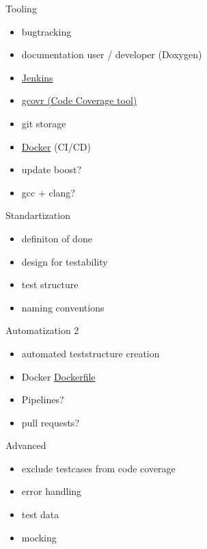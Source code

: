 \documentclass{beamer}
\begin{document}
    \begin{frame}{Tooling}
        \begin{itemize}
            \item bugtracking
            \item documentation user / developer (Doxygen)
            \item \href{https://www.jenkins.io/doc/}{Jenkins}
            \item \href{https://www.gcovr.com/en/stable/guide.html}{gcovr (Code Coverage tool)}
            \item git storage
            \item \href{https://docs.docker.com/}{Docker} (CI/CD)
            \item update boost?
            \item gcc + clang?
        \end{itemize}
    \end{frame}

    \begin{frame}{Standartization}
        \begin{itemize}
            \item definiton of done
            \item design for testability
            \item test structure
            \item naming conventions
        \end{itemize}
    \end{frame}

    \begin{frame}{Automatization 2}
        \begin{itemize}
            \item automated teststructure creation 
            \item Docker \href{https://github.com/Tobias-Trautmann/docker4ug4}{Dockerfile}
            \item Pipelines?
            \item pull requests?
        \end{itemize}
    \end{frame}

    \begin{frame}{Advanced}
        \begin{itemize}
            \item exclude testcases from code coverage
            \item error handling
            \item test data%
            \item mocking
        \end{itemize}
    \end{frame}
    
\end{document}
